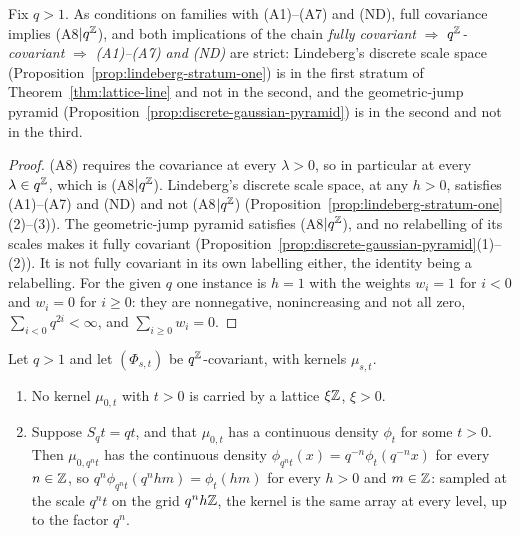\begin{theorem}
\label{cor:lattice-line-strict}

Fix $q > 1$. As conditions on families with (A1)--(A7) and (ND), full covariance implies
(A8$|q^{\mathbb{Z}}$), and both implications of the chain
\emph{fully covariant} $\Rightarrow$ \emph{$q^{\mathbb{Z}}$-covariant} $\Rightarrow$ \emph{(A1)--(A7) and
(ND)} are strict: Lindeberg's discrete scale space
(Proposition~\ref{prop:lindeberg-stratum-one}) is in the first stratum of
Theorem~\ref{thm:lattice-line} and not in the second, and the geometric-jump pyramid
(Proposition~\ref{prop:discrete-gaussian-pyramid}) is in the second and not in the third.
\end{theorem}

\begin{proof}
(A8) requires the covariance at every $\lambda > 0$, so in particular at every $\lambda \in q^{\mathbb{Z}}$,
which is (A8$|q^{\mathbb{Z}}$). Lindeberg's discrete scale space, at any $h > 0$, satisfies (A1)--(A7)
and (ND) and not (A8$|q^{\mathbb{Z}}$) (Proposition~\ref{prop:lindeberg-stratum-one}(2)--(3)). The
geometric-jump pyramid satisfies (A8$|q^{\mathbb{Z}}$), and no relabelling of its scales makes it fully
covariant (Proposition~\ref{prop:discrete-gaussian-pyramid}(1)--(2)). It is not fully covariant in
its own labelling either, the identity being a relabelling. For the given $q$ one instance is
$h = 1$ with the weights $w_i = 1$ for $i < 0$ and $w_i = 0$ for $i \ge 0$: they are nonnegative,
nonincreasing and not all zero, $\sum_{i<0}q^{2i} < \infty$, and $\sum_{i \ge 0}w_i = 0$.
\end{proof}

\begin{proposition}
\label{prop:no-lattice-kernel-line}

Let $q > 1$ and let $(\Phi_{s,t})$ be $q^{\mathbb{Z}}$-covariant, with kernels $\mu_{s,t}$.
\begin{enumerate}
\item No kernel $\mu_{0,t}$ with $t > 0$ is carried by a lattice $\xi\mathbb{Z}$, $\xi > 0$.
\item Suppose $S_qt = qt$, and that $\mu_{0,t}$ has a continuous density $\phi_t$ for some
$t > 0$. Then $\mu_{0,q^nt}$ has the continuous density $\phi_{q^nt}(x) = q^{-n}\phi_t(q^{-n}x)$
for every $n \in \mathbb{Z}$, so $q^n\phi_{q^nt}(q^nhm) = \phi_t(hm)$ for every $h > 0$ and $m \in \mathbb{Z}$:
sampled at the scale $q^nt$ on the grid $q^nh\mathbb{Z}$, the kernel is the same array at every level,
up to the factor $q^n$.
\end{enumerate}
\end{proposition}

